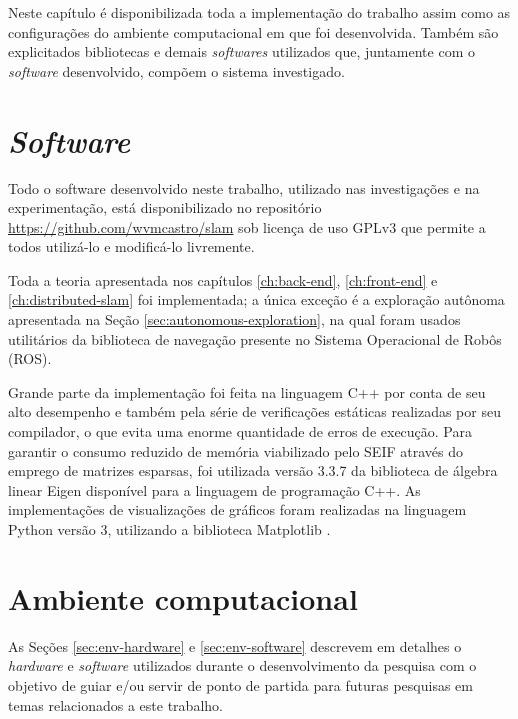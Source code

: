 Neste capítulo é disponibilizada toda a implementação do trabalho assim 
como as configurações do ambiente computacional em que foi desenvolvida. 
Também são explicitados bibliotecas e demais \textit{softwares} 
utilizados que, juntamente com o \textit{software} desenvolvido, compõem o 
sistema investigado.

\section{\textit{Software}}

Todo o software desenvolvido neste trabalho, utilizado nas investigações 
e na experimentação, está disponibilizado no 
repositório \url{https://github.com/wvmcastro/slam} sob licença de uso 
GPLv3 que permite a todos utilizá-lo e modificá-lo livremente.

Toda a teoria apresentada nos capítulos \ref{ch:back-end}, \ref{ch:front-end} e \ref{ch:distributed-slam} foi implementada; a única 
exceção é a exploração autônoma apresentada na Seção \ref{sec:autonomous-exploration}, na qual foram usados utilitários da 
biblioteca de navegação \cite{marder2010office} presente no Sistema 
Operacional de Robôs (ROS).

Grande parte da implementação foi feita na linguagem C++ por conta de 
seu alto desempenho e também pela série de verificações estáticas 
realizadas por seu compilador, o que evita uma enorme quantidade de 
erros de execução. Para garantir o consumo reduzido de memória viabilizado 
pelo SEIF através do emprego de matrizes esparsas, foi utilizada versão 3.3.7 
da biblioteca de álgebra linear Eigen \cite{eigen-lib} disponível para a linguagem de programação C++. As implementações 
de visualizações de gráficos foram realizadas na linguagem Python versão 
3, utilizando a biblioteca Matplotlib \cite{hunter2007matplotlib}.

\section{Ambiente computacional}

As Seções \ref{sec:env-hardware} e \ref{sec:env-software} descrevem em 
detalhes o \textit{hardware} e \textit{software} utilizados durante o 
desenvolvimento da pesquisa com o objetivo de guiar e/ou servir de 
ponto de partida para futuras pesquisas em temas relacionados a este 
trabalho.

